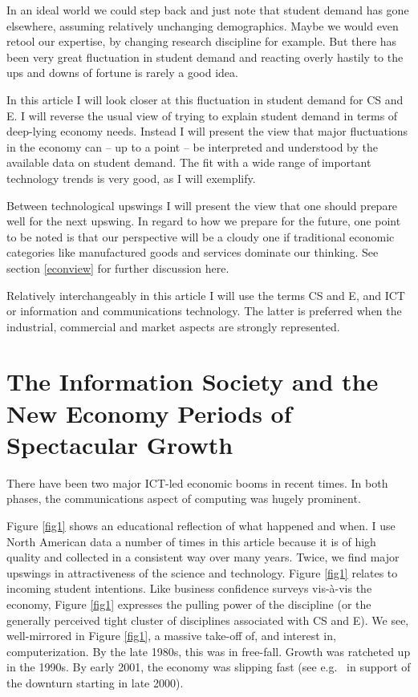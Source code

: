 \documentclass{article}
\begin{document}
In an ideal world we could step back and just note that 
student demand has gone 
elsewhere, assuming relatively unchanging demographics.  Maybe we 
would even retool our expertise, by changing research 
discipline for example.  
But there has been very great fluctuation in student demand
and reacting overly hastily to 
the ups and downs of fortune is rarely a good idea.  

In this article I will look 
closer at this fluctuation in student demand for CS and E.  
I will reverse the usual 
view of trying to explain student demand in terms of
deep-lying  economy needs.  
Instead I will present the view that major fluctuations 
in the economy can  --  up to 
a point -- be interpreted and understood by the available 
data on student demand.   The fit with a wide range of 
important technology trends is very good, as I will exemplify.

Between technological upswings I will present the view that one should 
prepare well for the next upswing.  
In regard to how we prepare for the future, one 
point to be noted is that our perspective will be a cloudy one
if traditional economic 
categories like manufactured goods and services dominate our 
thinking.  See section \ref{econview} for further discussion here.  

Relatively interchangeably in this article I will use the 
terms CS and E, and ICT or information and communications 
technology.  The latter is preferred when the industrial,
commercial and market aspects are strongly represented.  


\section{The 
Information Society and the New Economy Periods of Spectacular Growth} 

There have been two major ICT-led economic booms in recent times.  
In both phases, the communications aspect of computing was hugely 
prominent.  

Figure \ref{fig1}  shows an educational 
reflection of what happened and when.  I use North American data a number
of times in this article because it is of high quality and collected
in a consistent way over many years.  Twice, we find major 
upswings in attractiveness of the science and technology.  
Figure \ref{fig1} relates to incoming student intentions.  Like business
confidence surveys vis-\`a-vis the economy, Figure \ref{fig1} 
expresses the pulling power of the discipline (or the 
generally perceived tight
cluster of disciplines associated with CS and E).  
We see, 
well-mirrored in Figure \ref{fig1}, a 
massive take-off of, and interest in, computerization.  By the late 
1980s, this was in free-fall.  Growth was ratcheted up in the 1990s.  
By early 2001, the economy was slipping fast (see e.g.\ \cite{rita} 
in support of the downturn starting in late 2000).  
\end{document}
